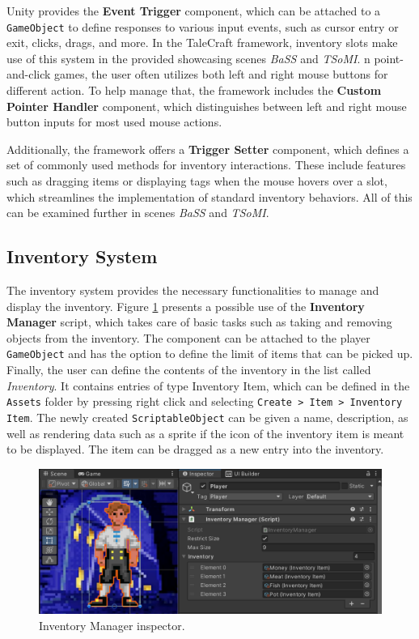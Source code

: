 Unity provides the \textbf{Event Trigger} component, which can be attached to a \verb|GameObject| to define responses to various input events, such as cursor entry or exit, clicks, drags, and more. In the TaleCraft framework, inventory slots make use of this system in the provided showcasing scenes \textit{BaSS} and \textit{TSoMI}. n point-and-click games, the user often utilizes both left and right mouse buttons for different action. To help manage that, the framework includes the \textbf{Custom Pointer Handler} component, which distinguishes between left and right mouse button inputs for most used mouse actions.

Additionally, the framework offers a \textbf{Trigger Setter} component, which defines a set of commonly used methods for inventory interactions. These include features such as dragging items or displaying tags when the mouse hovers over a slot, which streamlines the implementation of standard inventory behaviors. All of this can be examined further in scenes \textit{BaSS} and \textit{TSoMI}.

\subsection{Inventory System}
\label{UD-IS}
The inventory system provides the necessary functionalities to manage and display the inventory. Figure \ref{fig:Manual-Inventory} presents a possible use of the \textbf{Inventory Manager} script, which takes care of basic tasks such as taking and removing objects from the inventory. The component can be attached to the player \verb|GameObject| and has the option to define the limit of items that can be picked up. Finally, the user can define the contents of the inventory in the list called \textit{Inventory}. It contains entries of type Inventory Item, which can be defined in the \verb|Assets| folder by pressing right click and selecting \verb|Create > Item > Inventory Item|. The newly created \verb|ScriptableObject| can be given a name, description, as well as rendering data such as a sprite if the icon of the inventory item is meant to be displayed. The item can be dragged as a new entry into the inventory.
\begin{figure}[H]
\centering
\includegraphics[width=1\linewidth]{img/User doc/inventory.png}
\caption{Inventory Manager inspector.}
\label{fig:Manual-Inventory}
\end{figure}

